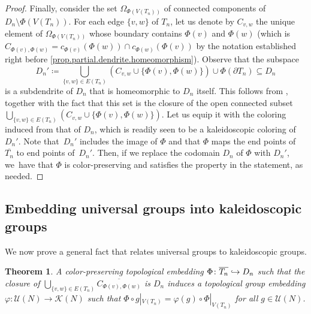 \documentclass[JEP,XML,SOM,Unicode,NoFloatCountersInSection,published]{cedram}
\newcommand\hto{\mathrel{\lhook\joinrel\to}}
\theoremstyle{plain}
\newtheorem{theorem}{Theorem}[section]
\theoremstyle{definition}
\theoremstyle{remark}
\newcommand{\U}{\mathcal{U}}
\newcommand{\K}{\mathcal{K}}
\begin{document}
\begin{proof}
Finally, consider the set $\Omega_{\Phi(V(T_n))}$ of connected components of $D_n \setminus \Phi(V(T_n))$.
For each edge $\{v,w\}$ of $T_n$, let us denote by $C_{v,w}$ the unique element of $\Omega_{\Phi(V(T_n))}$ whose boundary contains $\Phi(v)$ and $\Phi(w)$ (which is $C_{\Phi(v),\Phi(w)}=c_{\Phi(v)}(\Phi(w)) \cap c_{\Phi(w)}(\Phi(v))$ by the notation established right before \cref{prop.partial.dendrite.homeomorphism}).
Observe that the subspace
\[
 D_n' \coloneqq \bigcup_{\{v,w\}\in E(T_n)} \left(C_{v,w}\cup\{\Phi(v),\Phi(w)\}\right) \cup \Phi(\partial T_n) \subseteq D_n 
\]
is a subdendrite of $D_n$ that is homeomorphic to $D_n$ itself.
This follows from \cite[Lem.\,2.14]{DendriteGroups}, together with the fact that this set is the closure of the open connected subset $\bigcup_{\{v,w\}\in E(T_n)} \left(C_{v,w}\cup\{\Phi(v),\Phi(w)\}\right)$.
Let us equip it with the coloring induced from that of $D_n$, which is readily seen to be a kaleidoscopic coloring of~$D_n'$.
Note that~$D_n'$ includes the image of $\Phi$ and that $\Phi$ maps the end points of $\overline{T_n}$ to end points of~$D_n'$.
Then, if we replace the codomain $D_n$ of $\Phi$ with $D_n'$, we~have that $\Phi$ is color-preserving and satisfies the property in the statement, as needed.
\end{proof}

\subsection{Embedding universal groups into kaleidoscopic groups}

We now prove a general fact that relates universal groups to kaleidoscopic groups.

\begin{theorem}
\label{thm.universal.embeds.into.kaleidoscopic}
A color-preserving topological embedding $\Phi \colon \overline{T_n} \hto D_n$ such that the closure of $\bigcup_{\{v,w\}\in E(T_n)} \overline{C_{\Phi(v),\Phi(w)}}$ is $D_n$ induces a topological group embedding $\varphi \colon \U(N) \to \K(N)$ such that $\Phi \circ g |_{V(T_n)} = \varphi(g) \circ \Phi|_{V(T_n)}$ for all $g \in \U(N)$.
\end{theorem}
\end{document}
